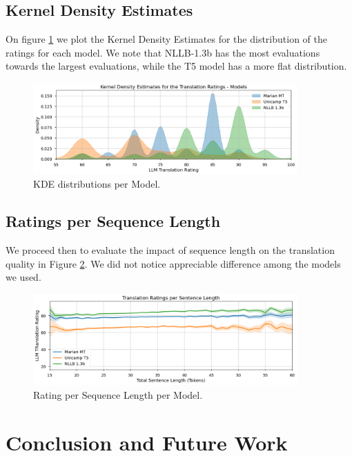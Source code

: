\documentclass{article}
\begin{document}
\subsection{Kernel Density Estimates}

On figure \ref{fig:kde} we plot the Kernel Density Estimates for the
distribution of the ratings for each model. We note that NLLB-1.3b has the most
evaluations towards the largest evaluations, while the T5 model has a more flat
distribution.

\begin{figure}[htbp]
    \centering
    \includegraphics[width=0.9\textwidth]{figures/kde.png}
    \caption{\label{fig:kde}KDE distributions per Model.}
\end{figure}
\FloatBarrier

\subsection{Ratings per Sequence Length}

We proceed then to evaluate the impact of sequence length on the translation
quality in Figure \ref{fig:line-chart}. We did not notice appreciable difference
among the models we used.

\begin{figure}[htpb]
    \centering
    \includegraphics[width=0.9\textwidth]{figures/line-chart.png}
    \caption{\label{fig:line-chart}Rating per Sequence Length per Model.}
\end{figure}

\section{Conclusion and Future Work}
\end{document}
